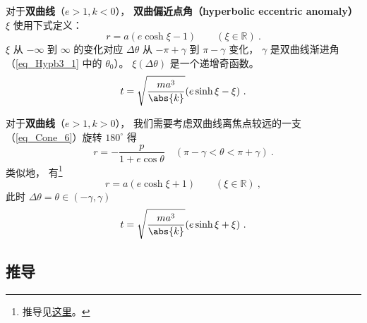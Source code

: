 对于\textbf{双曲线}（$e>1, k<0$）， \textbf{双曲偏近点角（hyperbolic eccentric anomaly）} $\xi$ 使用下式定义：
\begin{equation}\label{eq_EqMoKp_2} %
r = a(e\cosh\xi - 1) \qquad (\xi \in \mathbb R)~.
\end{equation}
$\xi$ 从 $-\infty$ 到 $\infty$ 的变化对应 $\Delta\theta$ 从 $-\pi+\gamma$ 到 $\pi-\gamma$ 变化， $\gamma$ 是双曲线渐进角（\autoref{eq_Hypb3_1}  中的 $\theta_0$）。 $\xi(\Delta\theta)$ 是一个递增奇函数。
\begin{equation}\label{eq_EqMoKp_4} %
t = \sqrt{\frac{ma^3}{\abs{k}}} (e\sinh\xi - \xi)~.
\end{equation}

对于\textbf{双曲线}（$e>1, k>0$）， 我们需要考虑双曲线离焦点较远的一支（\autoref{eq_Cone_6}）旋转 $180^\circ$ 得
\begin{equation} %
r = -\frac{p}{1 + e\cos\theta} \quad (\pi-\gamma<\theta<\pi+\gamma)~.
\end{equation}
类似地， 有\footnote{推导见\href{https://comethunter.lamost.org/scwrk/THECAL/fkepler.pdf}{这里}。}
\begin{equation} %
r = a(e\cosh\xi + 1) \qquad (\xi \in \mathbb R)~,
\end{equation}
此时 $\Delta\theta = \theta \in (-\gamma, \gamma)$
\begin{equation}\label{eq_EqMoKp_6} %
t = \sqrt{\frac{ma^3}{\abs{k}}} (e\sinh\xi + \xi)~.
\end{equation}

\subsection{推导}

